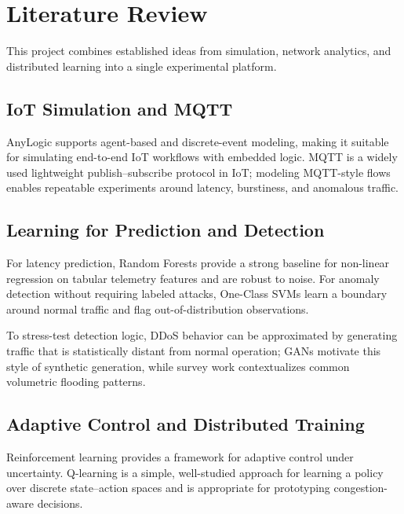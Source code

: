 \chapter{Literature Review}

This project combines established ideas from simulation, network analytics, and distributed learning into a single experimental platform.

\section{IoT Simulation and MQTT}

AnyLogic \cite{anylogic} supports agent-based and discrete-event modeling, making it suitable for simulating end-to-end IoT workflows with embedded logic. MQTT \cite{mqtt} is a widely used lightweight publish--subscribe protocol in IoT; modeling MQTT-style flows enables repeatable experiments around latency, burstiness, and anomalous traffic.

\section{Learning for Prediction and Detection}

For latency prediction, Random Forests \cite{rf} provide a strong baseline for non-linear regression on tabular telemetry features and are robust to noise. For anomaly detection without requiring labeled attacks, One-Class SVMs \cite{ocsvm} learn a boundary around normal traffic and flag out-of-distribution observations.

To stress-test detection logic, DDoS behavior can be approximated by generating traffic that is statistically distant from normal operation; GANs \cite{gan} motivate this style of synthetic generation, while survey work \cite{ddos} contextualizes common volumetric flooding patterns.

\section{Adaptive Control and Distributed Training}

Reinforcement learning provides a framework for adaptive control under uncertainty. Q-learning \cite{qlearning} is a simple, well-studied approach for learning a policy over discrete state--action spaces and is appropriate for prototyping congestion-aware decisions.

